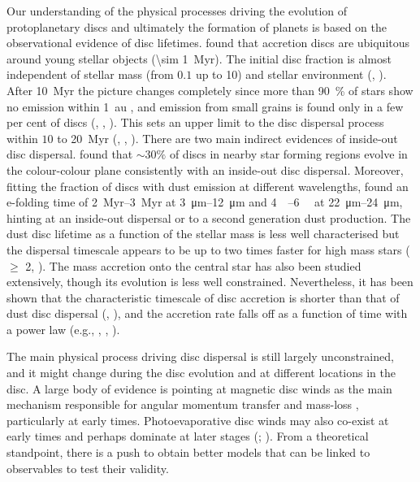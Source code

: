 Our understanding of the physical processes driving the evolution of protoplanetary discs and ultimately the formation of planets is based on the observational evidence of disc lifetimes.
\citet{1989AJ.....97.1451S} found that accretion discs are ubiquitous around young stellar objects (\SI{\sim 1}{Myr}). The initial disc fraction is almost independent of stellar mass (from $0.1$ up to \SI{10}{\solarmass}) and stellar environment (\citet{2000AJ....120.3162L}, \citet{2006A&A...451..177B}).
After \SI{10}{Myr} the picture changes completely since more than \SI{90}{\percent} of stars show no emission within \SI{1}{\astronomicalunit} \citep{2004ApJ...612..496M}, and emission from small grains is found only in a few per cent of discs (\citet{2004ApJ...608..526L}, \citet{2005AJ....129.1049C}, \citet{2006ApJ...639.1138S}).
This sets an upper limit to the disc dispersal process within $10$ to \SI{20}{Myr} (\citet{2007ApJ...671.1784H}, \citet{2010A&A...510A..72F}, \citet{2014A&A...561A..54R}).
There are two main indirect evidences of inside-out disc dispersal. \citet{2013MNRAS.428.3327K} found that $\sim30\%$ of discs in nearby star forming regions evolve in the colour-colour plane consistently with an inside-out disc dispersal. Moreover, fitting the fraction of discs with dust emission at different wavelengths, \citet{2014A&A...561A..54R} found an e-folding time of \SIrange{2}{3}{Myr} at \SIrange[]{3}{12}{\micro\meter} and \SIrange[]{4}{6}{\mega\year} at \SIrange[]{22}{24}{\micro\meter}, hinting at an inside-out dispersal or to a second generation dust production.
The dust disc lifetime as a function of the stellar mass is less well characterised but the dispersal timescale appears to be up to two times faster for high mass stars ($\geq$ \SI{2}{\solarmass}, \cite{2015A&A...576A..52R}).
The mass accretion onto the central star has also been studied extensively, though its evolution is less well constrained. Nevertheless, it has been shown that the characteristic timescale of disc accretion is shorter than that of dust disc dispersal (\cite{2006ApJ...648.1206J}, \cite{2010A&A...510A..72F}), and the accretion rate falls off as a function of time with a power law (e.g., \cite{2012ApJ...755..154M}, \cite{2014A&A...572A..62A}, \cite{2016ARA&A..54..135H}).

The main physical process driving disc dispersal is still largely unconstrained, and it might change during the disc evolution and at different locations in the disc. A large body of evidence is pointing at magnetic disc winds as the main mechanism responsible for angular momentum transfer and mass-loss \citep{2016ApJ...821...80B}, particularly at early times. Photoevaporative disc winds may also co-exist at early times and perhaps dominate at later stages (\cite{2017RSOS....470114E}; \cite{2020MNRAS.496..223W}). From a theoretical standpoint, there is a push to obtain better models that can be linked to observables to test their validity.

